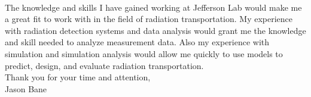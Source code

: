 \documentclass[12pt,letterpaper]{article}
\begin{document}
\paragraph{}The knowledge and skills I have gained working at Jefferson Lab would make me a great fit to work with in the field of radiation transportation. My experience with radiation detection systems and data analysis would grant me the knowledge and skill needed to analyze measurement data. Also my experience with simulation and simulation analysis would allow me quickly to use models to predict, design, and evaluate radiation transportation. 
\\

\noindent Thank you for your time and attention,\\
\noindent Jason Bane
\end{document}
